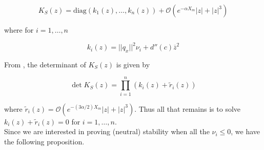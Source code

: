 \documentclass[12pt]{article}
\begin{document}
\begin{equation}
K_S(z) = \text{diag}(k_1(z), \dots, k_n(z)) + \mathcal{O}(e^{-\alpha X_m}|z| + |z|^3)
\end{equation}

where for $i = 1, \dots, n$

\begin{equation}
k_i(z) = ||q_x||^2 \nu_i + d''(c) \overline{z}^2
\end{equation}

From \cite{Ipsen2008}, the determinant of $K_S(z)$ is given by

\begin{equation}\label{detK}
\det K_S(z) = \prod_{i = 1}^n (k_i(z) + \tilde{r}_i(z))
\end{equation}

where $\tilde{r}_i(z) = \mathcal{O}(e^{-(3 \alpha/2) X_m}|z| + |z|^3)$. Thus all that remains is to solve $k_i(z) + \tilde{r}_i(z) = 0$ for $i = 1, \dots, n$.\\

Since we are interested in proving (neutral) stability when all the $\nu_i \leq 0$, we have the following proposition.
\end{document}

